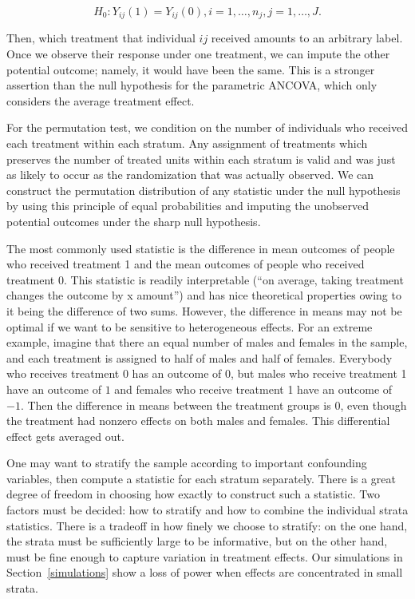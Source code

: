 \documentclass[11pt]{article}
\begin{document}
$$H_0: Y_{ij}(1) = Y_{ij}(0), i = 1, \dots, n_j, j = 1,\dots, J.$$

Then, which treatment that individual $ij$ received amounts to an arbitrary label.
Once we observe their response under one treatment, we can impute the other potential outcome; namely, it would have been the same.
This is a stronger assertion than the null hypothesis for the parametric ANCOVA, which only considers the average treatment effect.

For the permutation test, we condition on the number of individuals who received each treatment within each stratum.
Any assignment of treatments which preserves the number of treated units within each stratum is valid and was just as likely to occur as the randomization that was actually observed.
We can construct the permutation distribution of any statistic under the null hypothesis by using this principle of equal probabilities and imputing the unobserved potential outcomes under the sharp null hypothesis.

The most commonly used statistic is the difference in mean outcomes of people who received treatment 1 and the mean outcomes of people who received treatment 0.  
This statistic is readily interpretable (``on average, taking treatment changes the outcome by x amount'') and has nice theoretical properties owing to it being the difference of two sums.
However, the difference in means may not be optimal if we want to be sensitive to heterogeneous effects.  
For an extreme example, imagine that there an equal number of males and females in the sample, and each treatment is assigned to half of males and half of females.  
Everybody who receives treatment 0 has an outcome of 0, but males who receive treatment 1 have an outcome of $1$ and females who receive treatment 1 have an outcome of $-1$.  
Then the difference in means between the treatment groups is $0$, even though the treatment had nonzero effects on both males and females.  
This differential effect gets averaged out.

One may want to stratify the sample according to important confounding variables, then compute a statistic for each stratum separately. 
There is a great degree of freedom in choosing how exactly to construct such a statistic.
Two factors must be decided: how to stratify and how to combine the individual strata statistics.
There is a tradeoff in how finely we choose to stratify:
on the one hand, the strata must be sufficiently large to be informative,
 but on the other hand, must be fine enough to capture variation in treatment effects.
Our simulations in Section~\ref{simulations} show a loss of power when effects are concentrated in small strata.
\end{document}
